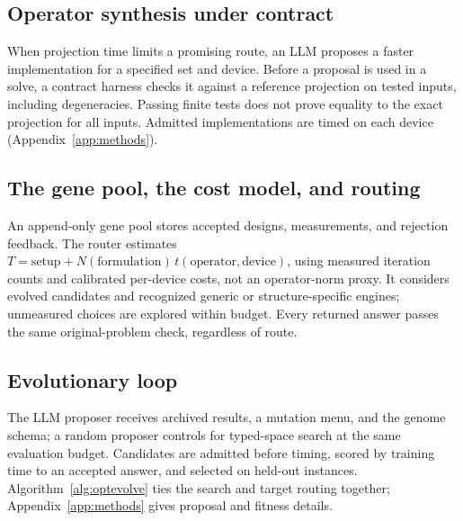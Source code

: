 \subsection{Operator synthesis under contract}
\label{sec:synthesis}
When projection time limits a promising route, an LLM proposes a faster implementation for a specified set and device. Before a proposal is used in a solve, a contract harness checks it against a reference projection on tested inputs, including degeneracies. Passing finite tests does not prove equality to the exact projection for all inputs. Admitted implementations are timed on each device (Appendix~\ref{app:methods}).

\subsection{The gene pool, the cost model, and routing}
\label{sec:routing}
An append-only gene pool stores accepted designs, measurements, and rejection feedback. The router estimates $T=\mathrm{setup}+N(\mathrm{formulation})\,t(\mathrm{operator},\mathrm{device})$, using measured iteration counts and calibrated per-device costs, not an operator-norm proxy. It considers evolved candidates and recognized generic or structure-specific engines; unmeasured choices are explored within budget. Every returned answer passes the same original-problem check, regardless of route.

\subsection{Evolutionary loop}
\label{sec:loop}
The LLM proposer receives archived results, a mutation menu, and the genome schema; a random proposer controls for typed-space search at the same evaluation budget. Candidates are admitted before timing, scored by training time to an accepted answer, and selected on held-out instances. Algorithm~\ref{alg:optevolve} ties the search and target routing together; Appendix~\ref{app:methods} gives proposal and fitness details.

